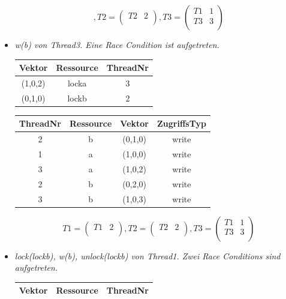 \documentclass[10pt,a4paper]{article}
\begin{document}
\begin{flushleft}
\begin{itemize}
\[	, T2 = \begin{pmatrix}
		T2 & 2\\
	\end{pmatrix}
	, T3 = \begin{pmatrix}
		T1 & 1\\		
		T3 & 3\\
	\end{pmatrix}
\]
\item \textit{w(b) von Thread3. Eine Race Condition ist aufgetreten.}\\[0.3cm]
\begin{tabular}{ >{\small}c >{\small}c >{\small}c }
  	Vektor & Ressource & ThreadNr \\\hline
  	(1,0,2) & locka & 3 \\
  	(0,1,0) & lockb & 2 \\\hline
\end{tabular}\hspace*{0.5cm}
\begin{tabular}{ >{\small}c >{\small}c >{\small}c >{\small}c }
  	ThreadNr & Ressource & Vektor & ZugriffsTyp \\\hline
  	2 & b & (0,1,0) & write \\
  	1 & a & (1,0,0) & write \\
  	3 & a & (1,0,2) & write \\
  	\color{red}2 & \color{red}b & \color{red}(0,2,0) & \color{red}write\\
  	\color{red}3 & \color{red}b & \color{red}(1,0,3) & \color{red}write \\\hline
\end{tabular}
\[
	T1 = \begin{pmatrix}
		T1 & 2\\
	\end{pmatrix}
	, T2 = \begin{pmatrix}
		T2 & 2\\
	\end{pmatrix}
	, T3 = \begin{pmatrix}
		T1 & 1\\		
		T3 & 3\\
	\end{pmatrix}
\]
\item \textit{lock(lockb), w(b), unlock(lockb) von Thread1. Zwei Race Conditions sind aufgetreten.}\\[0.3cm]
\begin{tabular}{ >{\small}c >{\small}c >{\small}c }
  	Vektor & Ressource & ThreadNr \\\hline

\end{tabular}
\end{itemize}
\end{flushleft}
\end{document}
